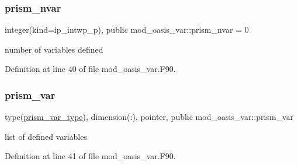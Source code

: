 \subsubsection{\texorpdfstring{prism\+\_\+nvar}{prism\_nvar}}
{\footnotesize\ttfamily integer(kind=ip\+\_\+intwp\+\_\+p), public mod\+\_\+oasis\+\_\+var\+::prism\+\_\+nvar = 0}



number of variables defined 



Definition at line 40 of file mod\+\_\+oasis\+\_\+var.\+F90.

\mbox{\label{namespacemod__oasis__var_ae66c490437c2960d795fbd3d2c773a0a}} 
\subsubsection{\texorpdfstring{prism\+\_\+var}{prism\_var}}
{\footnotesize\ttfamily type(\hyperlink{structmod__oasis__var_1_1prism__var__type}{prism\+\_\+var\+\_\+type}), dimension(\+:), pointer, public mod\+\_\+oasis\+\_\+var\+::prism\+\_\+var}



list of defined variables 



Definition at line 41 of file mod\+\_\+oasis\+\_\+var.\+F90.

